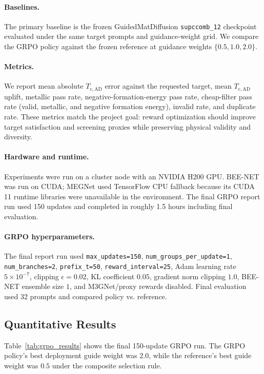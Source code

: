 \documentclass{article}
\newcommand{\Tcad}{T_{\mathrm{c,AD}}}
\begin{document}
\paragraph{Baselines.}
The primary baseline is the frozen GuidedMatDiffusion \texttt{supccomb\_12} checkpoint evaluated under the same target prompts and guidance-weight grid. We compare the GRPO policy against the frozen reference at guidance weights $\{0.5,1.0,2.0\}$.

\paragraph{Metrics.}
We report mean absolute $\Tcad$ error against the requested target, mean $\Tcad$ uplift, metallic pass rate, negative-formation-energy pass rate, cheap-filter pass rate (valid, metallic, and negative formation energy), invalid rate, and duplicate rate. These metrics match the project goal: reward optimization should improve target satisfaction and screening proxies while preserving physical validity and diversity.

\paragraph{Hardware and runtime.}
Experiments were run on a cluster node with an NVIDIA H200 GPU. BEE-NET was run on CUDA; MEGNet used TensorFlow CPU fallback because its CUDA 11 runtime libraries were unavailable in the environment. The final GRPO report run used 150 updates and completed in roughly 1.5 hours including final evaluation.

\paragraph{GRPO hyperparameters.}
The final report run used \texttt{max\_updates=150}, \texttt{num\_groups\_per\_update=1}, \texttt{num\_branches=2}, \texttt{prefix\_t=50}, \texttt{reward\_interval=25}, Adam learning rate $5\times 10^{-7}$, clipping $\epsilon=0.02$, KL coefficient $0.05$, gradient norm clipping $1.0$, BEE-NET ensemble size $1$, and M3GNet/proxy rewards disabled. Final evaluation used 32 prompts and compared policy vs. reference.

\subsection{Quantitative Results}
Table~\ref{tab:grpo_results} shows the final 150-update GRPO run. The GRPO policy's best deployment guide weight was $2.0$, while the reference's best guide weight was $0.5$ under the composite selection rule.
\end{document}
